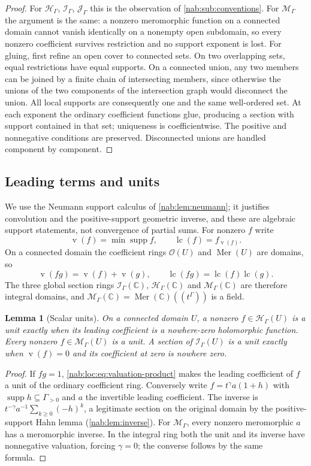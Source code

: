 \documentclass[11pt,letterpaper]{article}
\newtheorem{lemma}[lemma]{Lemma}
\theoremstyle{definition}
\theoremstyle{remark}
\newcommand{\C}{\mathbb C}
\newcommand{\OO}{\mathcal O}
\newcommand{\HH}{\mathscr H_\Gamma}
\newcommand{\II}{\mathscr I_\Gamma}
\newcommand{\JJ}{\mathscr J_\Gamma}
\newcommand{\supp}{\operatorname{supp}}
\newcommand{\val}{\operatorname{v}}
\newcommand{\MM}{\mathscr M_\Gamma}
\newcommand{\Mer}{\operatorname{Mer}}
\newcommand{\lc}{\operatorname{lc}}
\numberwithin{equation}{section}
\begin{document}
\begin{proof}
For $\HH$, $\II$, $\JJ$ this is the observation of
\cref{nab:sub:conventions}. For $\MM$ the argument is the same: a nonzero
meromorphic function on a connected domain cannot vanish identically on a
nonempty open subdomain, so every nonzero coefficient survives restriction and
no support exponent is lost. For gluing, first refine an open cover to
connected sets. On two overlapping sets, equal restrictions have equal
supports. On a connected union, any two members can be joined by a finite chain
of intersecting members, since otherwise the unions of the two components of
the intersection graph would disconnect the union. All local supports are
consequently one and the same well-ordered set. At each exponent the ordinary
coefficient functions glue, producing a section with support contained in that
set; uniqueness is coefficientwise. The positive and nonnegative conditions are
preserved. Disconnected unions are handled component by component.
\end{proof}

\subsection{Leading terms and units}

We use the Neumann support calculus of \cref{nab:lem:neumann}; it justifies
convolution and the positive-support geometric inverse, and these are
algebraic support statements, not convergence of partial sums. For nonzero
$f$ write
\[
 \val(f)=\min\supp f,\qquad \lc(f)=f_{\val(f)}.
\]
On a connected domain the coefficient rings $\OO(U)$ and $\Mer(U)$ are
domains, so
\begin{equation}\label{nab:loc:eq:valuation-product}
 \val(fg)=\val(f)+\val(g),\qquad
 \lc(fg)=\lc(f)\lc(g).
\end{equation}
The three global section rings $\II(\C)$, $\HH(\C)$ and $\MM(\C)$ are
therefore integral domains, and $\MM(\C)=\Mer(\C)((t^\Gamma))$ is a field.

\begin{lemma}[Scalar units]\label{nab:loc:lem:units}
On a connected domain $U$, a nonzero $f\in\HH(U)$ is a unit exactly when its
leading coefficient is a nowhere-zero holomorphic function. Every nonzero
$f\in\MM(U)$ is a unit. A section of $\II(U)$ is a unit exactly when
$\val(f)=0$ and its coefficient at zero is nowhere zero.
\end{lemma}

\begin{proof}
If $fg=1$, \eqref{nab:loc:eq:valuation-product} makes the leading coefficient of
$f$ a unit of the ordinary coefficient ring. Conversely write
$f=t^\gamma a(1+h)$ with $\supp h\subseteq\Gamma_{>0}$ and $a$ the invertible
leading coefficient. The inverse is $t^{-\gamma}a^{-1}\sum_{k\geq0}(-h)^k$,
a legitimate section on the original domain by the positive-support Hahn lemma
(\cref{nab:lem:inverse}). For $\MM$, every nonzero meromorphic $a$ has a
meromorphic inverse. In the integral ring both the unit and its inverse have
nonnegative valuation, forcing $\gamma=0$; the converse follows by the same
formula.
\end{proof}
\end{document}
